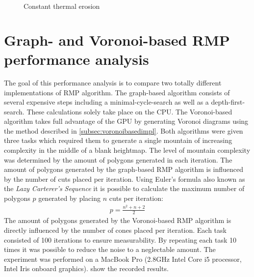 \documentclass[11pt,a4paper,twoside,openright]{report}
\begin{document}
\begin{figure}[!htb]
  \caption{Constant thermal erosion}\label{fig:thermalafter2}
\endminipage
\end{figure}

\section{Graph- and Voronoi-based RMP performance analysis}
The goal of this performance analysis is to compare two totally different implementations of RMP algorithm. The graph-based algorithm consists of several expensive steps including a minimal-cycle-search as well as a depth-first-search. These calculations solely take place on the CPU. The Voronoi-based algorithm takes full advantage of the GPU by generating Voronoi diagrams using the method described in \cref{subsec:voronoibasedimpl}. Both algorithms were given three tasks which required them to generate a single mountain of increasing complexity in the middle of a blank heightmap. The level of mountain complexity was determined by the amount of polygons generated in each iteration. The amount of polygons generated by the graph-based RMP algorithm is influenced by the number of cuts placed per iteration. Using Euler's formula also known as the \emph{Lazy Carterer's Sequence} \cite{Moore:1991} it is possible to calculate the maximum number of polygons $p$ generated by placing $n$ cuts per iteration:
\begin{align}
  p = \frac{n^2 + n + 2}{2}
\end{align}
The amount of polygons generated by the Voronoi-based RMP algorithm is directly influenced by the number of cones placed per iteration. Each task consisted of 100 iterations to ensure measurability. By repeating each task 10 times it was possible to reduce the noise to a neglectable amount. The experiment was performed on a MacBook Pro (2.8GHz Intel Core i5 processor, Intel Iris onboard graphics).  show the recorded results.
\end{document}
